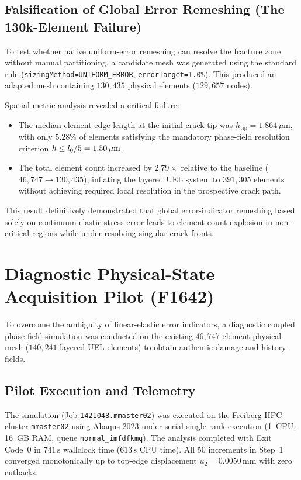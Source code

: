 \subsection{Falsification of Global Error Remeshing (The 130k-Element Failure)}
\label{subsec:hole_130k_failure}

To test whether native \Abaqus uniform-error remeshing can resolve the fracture zone without manual partitioning, a candidate mesh was generated using the standard rule (\texttt{sizingMethod=UNIFORM\_ERROR}, \texttt{errorTarget=1.0\%}). This produced an adapted mesh containing $130{,}435$ physical elements ($129{,}657$ nodes). 

Spatial metric analysis revealed a critical failure:
\begin{itemize}
  \item The median element edge length at the initial crack tip was $h_{\mathrm{tip}} = 1.864\,\mu\mathrm{m}$, with only $5.28\%$ of elements satisfying the mandatory phase-field resolution criterion $h \le l_0 / 5 = 1.50\,\mu\mathrm{m}$.
  \item The total element count increased by $2.79\times$ relative to the baseline ($46{,}747 \to 130{,}435$), inflating the layered UEL system to $391{,}305$ elements without achieving required local resolution in the prospective crack path.
\end{itemize}
This result definitively demonstrated that global error-indicator remeshing based solely on continuum elastic stress error leads to element-count explosion in non-critical regions while under-resolving singular crack fronts.

\section{Diagnostic Physical-State Acquisition Pilot (F1642)}
\label{sec:hole_pilot}

To overcome the ambiguity of linear-elastic error indicators, a diagnostic coupled phase-field simulation was conducted on the existing $46{,}747$-element physical mesh ($140{,}241$ layered UEL elements) to obtain authentic damage and history fields.

\subsection{Pilot Execution and Telemetry}
\label{subsec:pilot_telemetry}

The simulation (Job \texttt{1421048.mmaster02}) was executed on the Freiberg HPC cluster \texttt{mmaster02} using Abaqus 2023 under serial single-rank execution (1~CPU, 16~GB RAM, queue \texttt{normal\_imfdfkmq}). The analysis completed with Exit Code~0 in $741\,\mathrm{s}$ wallclock time ($613\,\mathrm{s}$ CPU time). All 50 increments in Step~1 converged monotonically up to top-edge displacement $u_2 = 0.0050\,\mathrm{mm}$ with zero cutbacks.

